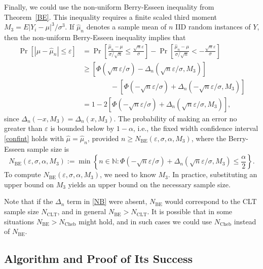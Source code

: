 \documentclass[graybox]{svmult}
\newcommand\natu{\mathbb{N}}
\newcommand{\Prob}{\Pr}
\newcommand{\abs}[1]{\left|#1\right|}
\newcommand{\hmu}{\hat{\mu}}
\def\abs#1{\ensuremath{\left \lvert #1 \right \rvert}}
\begin{document}
Finally, we could use the non-uniform Berry-Esseen
inequality from Theorem~\ref{BE}.
This inequality requires a finite scaled third moment
$M_3=E\abs{Y_i - \mu}^3/\sigma^3$.
If $\hmu_n$ denotes a sample mean of $n$ IID random instances of $Y$, then the non-uniform Berry-Esseen inequality implies that
\begin{align} 
\nonumber
\Prob\left[\abs{\mu-\hmu_n}  \le \varepsilon \right]
&=\Prob\left[\frac{\hmu_n - \mu}{\sigma/\sqrt{n}} \le \frac{\sqrt{n}\varepsilon}{\sigma} \right]-\Prob\left[\frac{\hmu_n - \mu}{\sigma/\sqrt{n}} < -\frac{\sqrt{n}\varepsilon}{\sigma}\right]\\ 
\nonumber
&\ge \left[\Phi(\sqrt{n}\varepsilon/\sigma)-\Delta_n(\sqrt{n}\varepsilon/\sigma,M_3)\right] \\
\nonumber
&\qquad \qquad -\left[\Phi(-\sqrt{n}\varepsilon/\sigma) + \Delta_n(-\sqrt{n}\varepsilon/\sigma,M_3)\right]\\
&=1-2[\Phi(-\sqrt{n}\varepsilon/\sigma) + \Delta_n(\sqrt{n}\varepsilon/\sigma,M_3)], \label{BEresult}
\end{align}
since $\Delta_n(-x,M_3)=\Delta_n(x,M_3)$.  The probability of
making an error no greater than $\varepsilon$ is bounded below by $1-\alpha$, i.e., the fixed width confidence interval \eqref{confint} holds with $\hmu=\hmu_n$, provided $n \ge N_{\text{BE}}(\varepsilon,\sigma,\alpha,M_3)$, where the Berry-Esseen sample size is
\begin{equation}\label{NB}
N_{\text{BE}}(\varepsilon,\sigma,\alpha,M_3) := \min \left \{ n \in \natu : \Phi\left(-\sqrt{n}\varepsilon/\sigma  \right)+\Delta_n(\sqrt{n}\varepsilon/\sigma,M_3)
\le \frac{\alpha}{2} \right \}.
\end{equation}
To compute $N_{\text{BE}}(\varepsilon,\sigma,\alpha,M_3)$, we need to know
$M_3$. In practice, substituting an upper
bound on $M_3$ yields an upper
bound on the necessary sample size.

Note that if the $\Delta_n$ term in \eqref{NB} were absent, $N_{\text{BE}}$ would correspond to the CLT sample size $N_{\text{CLT}}$, and in general $N_{\text{BE}}>N_{\text{CLT}}$.   It is possible that in some situations
$N_{\text{BE}}>N_{\text{Cheb}}$ might
hold, and in such cases we could use $N_{\text{Cheb}}$
instead of $N_{\text{BE}}$.

\subsection{Algorithm and Proof of Its Success}
\end{document}
